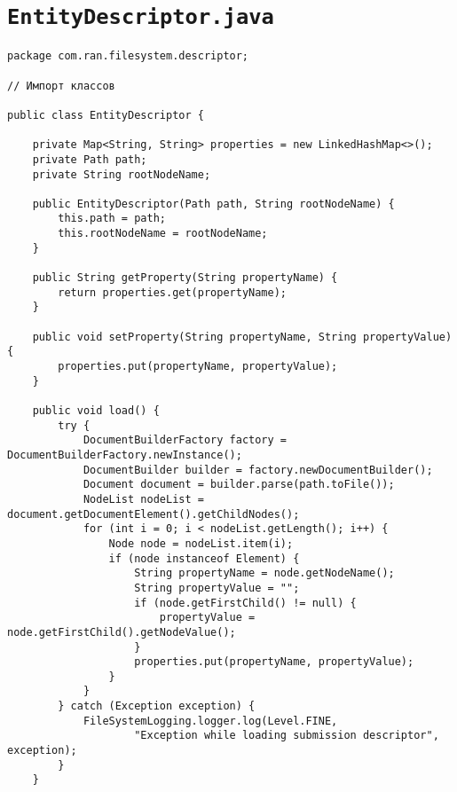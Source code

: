 \section*{\texttt{EntityDescriptor.java}}
\begin{verbatim}
package com.ran.filesystem.descriptor;

// Импорт классов

public class EntityDescriptor {

    private Map<String, String> properties = new LinkedHashMap<>();
    private Path path;
    private String rootNodeName;

    public EntityDescriptor(Path path, String rootNodeName) {
        this.path = path;
        this.rootNodeName = rootNodeName;
    }
    
    public String getProperty(String propertyName) {
        return properties.get(propertyName);
    }
    
    public void setProperty(String propertyName, String propertyValue) {
        properties.put(propertyName, propertyValue);
    }
    
    public void load() {
        try {
            DocumentBuilderFactory factory = DocumentBuilderFactory.newInstance();
            DocumentBuilder builder = factory.newDocumentBuilder();
            Document document = builder.parse(path.toFile());
            NodeList nodeList = document.getDocumentElement().getChildNodes();
            for (int i = 0; i < nodeList.getLength(); i++) {
                Node node = nodeList.item(i);
                if (node instanceof Element) {
                    String propertyName = node.getNodeName();
                    String propertyValue = "";
                    if (node.getFirstChild() != null) {
                        propertyValue = node.getFirstChild().getNodeValue();
                    }
                    properties.put(propertyName, propertyValue);
                }
            }
        } catch (Exception exception) {
            FileSystemLogging.logger.log(Level.FINE,
                    "Exception while loading submission descriptor", exception);
        }
    }
    

\end{verbatim}
